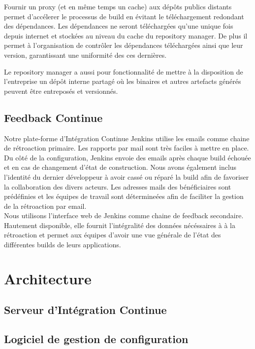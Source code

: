       Fournir un proxy (et en même temps un cache) aux dépôts publics distants permet d'accélerer le processus de build en évitant le téléchargement redondant des dépendances. Les dépendances ne seront téléchargées qu'une unique fois depuis internet et stockées au niveau du cache du repository manager. De plus il permet à l'organisation de contrôler les dépendances téléchargées ainsi que leur version, garantissant une uniformité des ces dernières.

      Le repository manager a aussi pour fonctionnalité de mettre à la disposition de l'entreprise un dépôt interne partagé où les binaires et autres artefacts générés peuvent être entreposés et versionnés.\\

    \subsection{Feedback Continue}
    Notre plate-forme d'Intégration Continue Jenkins utilise les emails comme chaine de rétroaction primaire. Les rapports par mail sont très faciles à mettre en place. Du côté de la configuration, Jenkins envoie des emails après chaque build échouée et en cas de changement d'état de construction. Nous avons également inclus l'identité du dernier développeur à avoir cassé ou réparé la build afin de favoriser la collaboration des divers acteurs. Les adresses mails des bénéficiaires sont prédéfinies et les équipes de travail sont détermineées afin de faciliter la gestion de la rétroaction par email.\\

    Nous utilisons l'interface web de Jenkins comme chaine de feedback secondaire. Hautement disponible, elle fournit l'intégralité des données nécéssaires à à la rétroaction et permet aux équipes d'avoir une vue générale de l'état des différentes builds de leurs applications.

  \section{Architecture}

    \subsection{Serveur d’Intégration Continue}

    \subsection{Logiciel de gestion de configuration}

